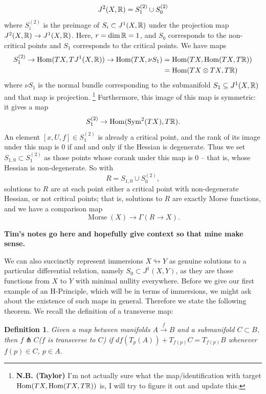 \documentclass{article}
\newtheorem{definition}[theorem]{Definition}
\newtheorem{proposed work}[theorem]{Proposed Work}
\DeclareMathOperator{\Hom}{Hom}
\begin{document}
\[
  J^2(X,\mathbb R) = S_1^{(2)} \cup S_0^{(2)}
\]
where $S_i^{(2)}$ is the preimage of $S_i\subset J^1(X, \mathbb R)$ under the projection map $J^2(X, \mathbb R)\to J^1(X, \mathbb R)$. Here, $r= \dim\mathbb R = 1$, and $S_0$ corresponds to the non-critical points and $S_1$ corresponds to the critical points. We have maps
\begin{align*}
  S^{(2)}_1\to \Hom(TX, TJ^1(X, \R))\to \Hom(TX, \nu S_1) &= \Hom(TX,\Hom(TX,T\R))\\
                                                          &= \Hom(TX\otimes TX, T\R)
\end{align*}
where $\nu S_1$ is the normal bundle corresponding to the submanifold $S_1\subseteq J^1(X,\mathbb R)$ and that map is projection.
\footnote{\textbf{N.B. (Taylor)} I'm not actually sure what the map/identification with target $\Hom(TX, \Hom(TX,T\R))$ is, I will try to figure it out and update this.}
Furthermore, this image of this map is symmetric: it gives a map
\[
  S^{(2)}_1\to\Hom(\operatorname{Sym}^2(TX), T\R).
\]
An element $[x, U, f]\in S^{(2)}_1$ is already a critical point, and the rank of its image under this map is 0 if and and only if the Hessian is degenerate. Thus we set $S_{1,0}\subset S^{(2)}_1$ as those points whose corank under this map is $0$ -- that is, whose Hessian is non-degenerate. So with
\[
R = S_{1,0}\cup S_0^{(2)},
\]
solutions to $R$ are at each point either a critical point with non-degenerate Hessian, or not critical points; that is, solutions to $R$ are exactly Morse functions, and we have a comparison map
\[
  \operatorname{Morse}(X)\to \Gamma(R\to X).
\]

\textbf{Tim's notes go here and hopefully give context so that mine make sense.}
\newline

We can also succinctly represent immersions $X \looparrowright Y$ as genuine solutions to a particular differential relation, namely $S_0 \subset J^1(X,Y)$, as they are those functions from $X$ to $Y$ with minimal nullity everywhere. 
Before we give our first example of an H-Principle, which will be in terms of immersions, we might ask about the existence of such maps in general. Therefore we state the following theorem.  We recall the definition of a transverse map:

\begin{definition}\label{thm: transverse}
Given a map between manifolds $A \xrightarrow{f} B$ and a submanifold $C \subset B$, then $f \pitchfork C$($f$ is transverse to $C$) if $df(T_p(A))+T_{f(p)}C=T_{f(p)}B$ whenever $f(p) \in C$, $ p \in A$.
\end{definition}
\end{document}
